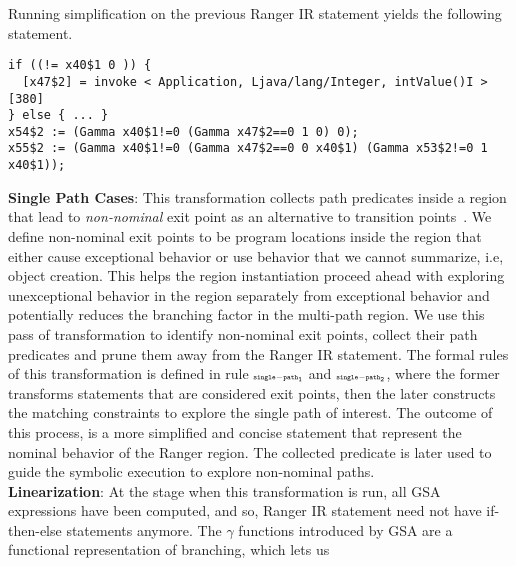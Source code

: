 %
Running simplification on the previous Ranger IR statement yields the following statement.
\begin{lstlisting}
if ((!= x40$1 0 )) {
  [x47$2] = invoke < Application, Ljava/lang/Integer, intValue()I >[380]
} else { ... }
x54$2 := (Gamma x40$1!=0 (Gamma x47$2==0 1 0) 0);
x55$2 := (Gamma x40$1!=0 (Gamma x47$2==0 0 x40$1) (Gamma x53$2!=0 1 x40$1));
\end{lstlisting}
%
\textbf{Single Path Cases}: This transformation collects path predicates inside a region that lead to
\textit{non-nominal} exit point as an alternative to transition points~\cite{veritesting}.
%
We define non-nominal exit points to be program locations inside the region that either cause
exceptional behavior or use behavior that we cannot summarize, i.e, object creation.
%
This helps the region instantiation proceed ahead with exploring unexceptional behavior in the region separately from
exceptional behavior and potentially reduces the branching factor in the multi-path region.
%
%
We use this pass of transformation to identify non-nominal exit points, collect their path predicates and prune them away from the
Ranger IR statement. The formal rules of this transformation is defined in rule $\scriptscriptstyle\mathtt{single-path_1}$ and
$\scriptscriptstyle\mathtt{single-path_2}$, where the former transforms statements that are considered exit points, then the later constructs
the matching constraints to explore the single path of interest.
%
The outcome of this process, is a more simplified and concise statement that represent the nominal behavior of the Ranger region.
%
The collected predicate is later used to guide the symbolic execution to explore non-nominal paths.\\
%
\textbf{Linearization}:
At the stage when this transformation is run, all GSA expressions have been computed, and so, Ranger IR statement
need not have if-then-else statements anymore.
%
The $\gamma$ functions introduced by GSA are a functional representation of branching, which lets us
